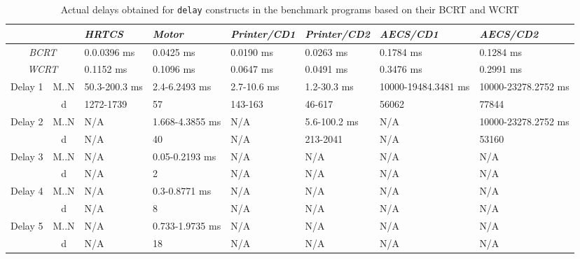 {\renewcommand{\arraystretch}{0.6}
\begin{table*}[t!]
\centering
	\caption{Actual delays obtained for \texttt{delay} constructs in the
benchmark programs based on their BCRT and WCRT}
\begin{tabular}{ c c l l l l l l }
	\toprule
	\multicolumn{2}{c}{} & \emph{HRTCS} & \emph{Motor} & \emph{Printer/CD1} &
	\emph{Printer/CD2} & \emph{AECS/CD1} &	\emph{AECS/CD2} \\ 
	\midrule
	\multicolumn{2}{c}{\emph{BCRT}}	& 0.0.0396 ms	& 0.0425 ms & 0.0190 ms &
	0.0263 ms & 0.1784 ms & 0.1284 ms\\ 
	\cmidrule(r){1-8}
	\multicolumn{2}{c}{\emph{WCRT}} &0.1152 ms & 0.1096 ms & 0.0647 ms
	& 0.0491 ms & 0.3476 ms & 0.2991 ms\\ 
	\cmidrule(r){1-8}

	\multirow{2}{*}{Delay 1} & M..N & 50.3-200.3 ms	& 2.4-6.2493 ms	  &
	2.7-10.6 ms & 1.2-30.3 ms & 10000-19484.3481 ms& 10000-23278.2752 ms \\
	\cmidrule(r){2-8}
	& d &1272-1739 & 57 & 143-163 & 46-617 & 56062 &77844\\ 
	\cmidrule(r){1-8}
	\multirow{2}{*}{Delay 2} & M..N & N/A & 1.668-4.3855 ms & N/A &
	5.6-100.2 ms & N/A &10000-23278.2752 ms\\ 
	\cmidrule(r){2-8}
	& d & N/A & 40 & N/A & 213-2041 & N/A &53160\\ 
	\cmidrule(r){1-8}
	\multirow{2}{*}{Delay 3} & M..N & N/A & 0.05-0.2193 ms & N/A & N/A & N/A
	&N/A\\ 
	\cmidrule(r){2-8}
	& d & N/A & 2 & N/A & N/A & N/A &N/A\\ 
	\cmidrule(r){1-8}
	\multirow{2}{*}{Delay 4} & M..N & N/A & 0.3-0.8771 ms & N/A & N/A & N/A
	&N/A\\ 
	\cmidrule(r){2-8}
	& d & N/A & 8 & N/A & N/A & N/A &N/A\\ 
	\cmidrule(r){1-8}
	\multirow{2}{*}{Delay 5} & M..N & N/A & 0.733-1.9735 ms & N/A & N/A & N/A
	&N/A\\ 
	\cmidrule(r){2-8}
	& d & N/A & 18 & N/A
	& N/A & N/A &N/A\\ \bottomrule
\end{tabular}
\label{fig:comparison}
\end{table*}
}

